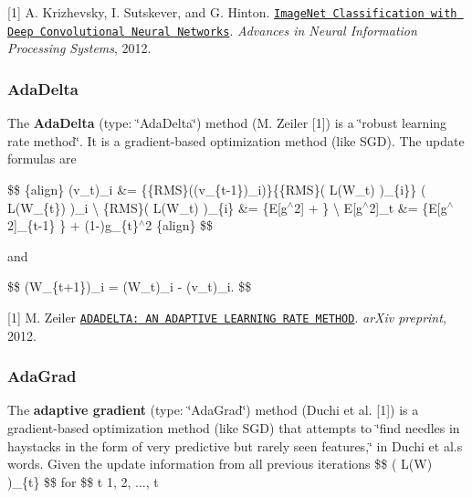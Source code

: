 \mbox{[}1\mbox{]} A. Krizhevsky, I. Sutskever, and G. Hinton. \href{http://papers.nips.cc/paper/4824-imagenet-classification-with-deep-convolutional-neural-networks.pdf}{\tt Image\+Net Classification with Deep Convolutional Neural Networks}. {\itshape Advances in Neural Information Processing Systems}, 2012.

\subsubsection*{Ada\+Delta}

The {\bfseries Ada\+Delta} ({\ttfamily type\+: \char`\"{}\+Ada\+Delta\char`\"{}}) method (M. Zeiler \mbox{[}1\mbox{]}) is a \char`\"{}robust learning rate method\char`\"{}. It is a gradient-\/based optimization method (like S\+GD). The update formulas are

\$\$ \{align\} (v\+\_\+t)\+\_\+i \&= \{\{R\+MS\}((v\+\_\+\{t-\/1\})\+\_\+i)\}\{\{R\+MS\}(  L(\+W\+\_\+t) )\+\_\+\{i\}\} (  L(W\+\_\+\{t\textquotesingle{}\}) )\+\_\+i \textbackslash{} \{R\+MS\}(  L(\+W\+\_\+t) )\+\_\+\{i\} \&= \{E\mbox{[}g$^\wedge$2\mbox{]} + \} \textbackslash{} E\mbox{[}g$^\wedge$2\mbox{]}\+\_\+t \&= \{E\mbox{[}g$^\wedge$2\mbox{]}\+\_\+\{t-\/1\} \} + (1-\/)g\+\_\+\{t\}$^\wedge$2 \{align\} \$\$

and

\$\$ (W\+\_\+\{t+1\})\+\_\+i = (W\+\_\+t)\+\_\+i -\/  (v\+\_\+t)\+\_\+i. \$\$

\mbox{[}1\mbox{]} M. Zeiler \href{http://arxiv.org/pdf/1212.5701.pdf}{\tt A\+D\+A\+D\+E\+L\+T\+A\+: AN A\+D\+A\+P\+T\+I\+VE L\+E\+A\+R\+N\+I\+NG R\+A\+TE M\+E\+T\+H\+OD}. {\itshape ar\+Xiv preprint}, 2012.

\subsubsection*{Ada\+Grad}

The {\bfseries adaptive gradient} ({\ttfamily type\+: \char`\"{}\+Ada\+Grad\char`\"{}}) method (Duchi et al. \mbox{[}1\mbox{]}) is a gradient-\/based optimization method (like S\+GD) that attempts to \char`\"{}find needles in haystacks in the form of very predictive but rarely seen features,\char`\"{} in Duchi et al.\textquotesingle{}s words. Given the update information from all previous iterations \$\$ (  L(\+W) )\+\_\+\{t\textquotesingle{}\} \$\$ for \$\$ t\textquotesingle{}  1, 2, ..., t 